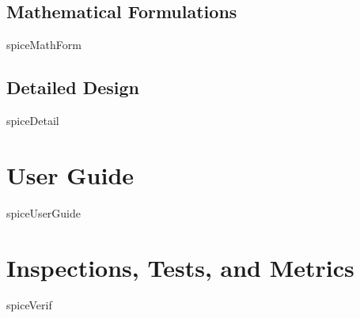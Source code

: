 \section{Mathematical Formulations}

 {spiceMathForm}


\section{Detailed Design}

 {spiceDetail}


\chapter{User Guide}\label{ch:user}

 {spiceUserGuide}


\chapter{Inspections, Tests, and Metrics}\label{ch:ivv}


 {spiceVerif}


\newpage
\boilerplatetraceability

\newpage
\boilerplatemetrics
